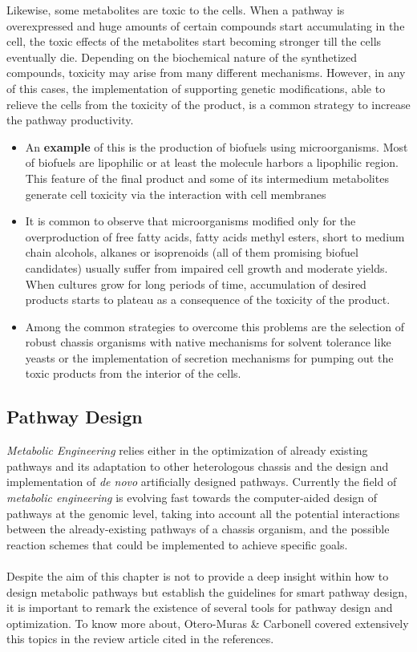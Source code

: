 Likewise, some metabolites are toxic to the cells. When a pathway is overexpressed and huge amounts of certain compounds start accumulating in the cell, the toxic effects of the metabolites start becoming stronger till the cells eventually die. Depending on the biochemical nature of the synthetized compounds, toxicity may arise from many different mechanisms. However, in any of this cases, the implementation of supporting genetic modifications, able to relieve the cells from the toxicity of the product, is a common strategy to increase the pathway productivity.
\begin{itemize}
    \item[] An \textbf{example} of this is the production of biofuels using microorganisms. Most of biofuels are lipophilic or at least the molecule harbors a lipophilic region. This feature of the final product and some of its intermedium metabolites generate cell toxicity via the interaction with cell membranes
    \item[]It is common to observe that microorganisms modified only for the overproduction of free fatty acids, fatty acids methyl esters, short to medium chain alcohols, alkanes or isoprenoids (all of them promising biofuel candidates) usually suffer from impaired cell growth and moderate yields. When cultures grow for long periods of time, accumulation of desired products starts to plateau as a consequence of the toxicity of the product.
    \item[]Among the common strategies to overcome this problems are the selection of robust chassis organisms with native mechanisms for solvent tolerance like yeasts or the implementation of secretion mechanisms for pumping out the toxic products from the interior of the cells.
\end{itemize}

\subsection{Pathway Design}
\textit{Metabolic Engineering} relies either in the optimization of already existing pathways and its adaptation to other heterologous chassis and the design and implementation of \textit{de novo} artificially designed pathways. Currently the field of \textit{metabolic engineering} is evolving fast towards the computer-aided design of pathways at the genomic level, taking into account all the potential interactions between the already-existing pathways of a chassis organism, and the possible reaction schemes that could be implemented to achieve specific goals. \\ \\
Despite the aim of this chapter is not to provide a deep insight within how to design metabolic pathways but establish the guidelines for smart pathway design, it is important to remark the existence of several tools for pathway design and optimization. To know more about, Otero-Muras \& Carbonell covered extensively this topics in the review article cited in the references.
